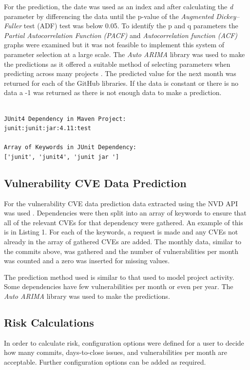 \documentclass[conference]{IEEEtran}
\begin{document}
For the prediction, the date was used as an index and after calculating the \textit{d} parameter by differencing the data until the p-value of the \textit{Augmented Dickey–Fuller} test (ADF) test was below 0.05. To identify the p and q parameters the \textit{Partial Autocorrelation Function (PACF)} and \textit{Autocorrelation function (ACF)} graphs were examined but it was not feasible to implement this system of parameter selection at a large scale. The \textit{Auto ARIMA} library was used to make the predictions as it offered a suitable method of selecting parameters when predicting across many projects \cite{noauthor_pmdarima_nodate}. The predicted value for the next month was returned for each of the GitHub libraries. If the data is constant or there is no data a -1 was returned as there is not enough data to make a prediction. 

\begin{lstlisting}[caption=Example Keywords]

JUnit4 Dependency in Maven Project:
junit:junit:jar:4.11:test

Array of Keywords in JUnit Dependency:
['junit', 'junit4', 'junit jar ']

\end{lstlisting}

\subsection{Vulnerability CVE Data Prediction}
For the vulnerability CVE data prediction data extracted using the NVD API was used \cite{noauthor_vulnerability_nodate}. Dependencies were then split into an array of keywords to ensure that all of the relevant CVEs for that dependency were gathered. An example of this is in Listing 1. For each of the keywords, a request is made and any CVEs not already in the array of gathered CVEs are added. The monthly data, similar to the commits above, was gathered and the number of vulnerabilities per month was counted and a zero was inserted for missing values. 

The prediction method used is similar to that used to model project activity. Some dependencies have few vulnerabilities per month or even per year. The \textit{Auto ARIMA} library was used to make the predictions. 

\subsection{Risk Calculations}
In order to calculate  risk, configuration options were defined for a user to decide how many commits, days-to-close issues, and vulnerabilities per month are acceptable. Further configuration options can be added as required. 
\end{document}
